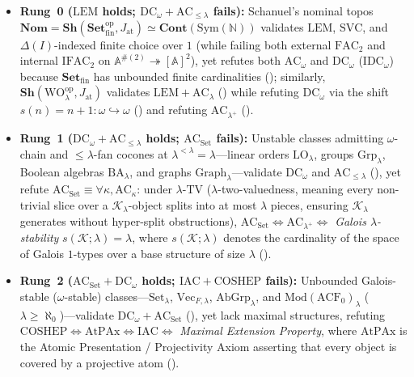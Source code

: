 \documentclass[10pt,twoside,openright]{book}
\theoremstyle{crmplain}
\theoremstyle{crmdef}
\theoremstyle{crmremark}
\begin{document}
\begin{itemize}[leftmargin=1.5em]
  \item \textbf{Rung~0 ($\mathrm{LEM}$ holds; $\mathrm{DC}_\omega + \mathrm{AC}_{\le \lambda}$ fails):} Schanuel's nominal topos $\mathbf{Nom} = \mathbf{Sh}(\mathbf{Set}_{\mathrm{fin}}^{\mathrm{op}}, J_{\mathrm{at}}) \simeq \mathbf{Cont}(\mathrm{Sym}(\mathbb{N}))$ validates $\mathrm{LEM}$, $\mathrm{SVC}$, and $\Delta(I)$-indexed finite choice over $1$ (while failing both external $\mathrm{FAC}_2$ and internal $\mathrm{IFAC}_2$ on $\mathbb{A}^{\#(2)} \twoheadrightarrow [\mathbb{A}]^2$), yet refutes both $\mathrm{AC}_\omega$ and $\mathrm{DC}_\omega$ ($\mathrm{IDC}_\omega$) because $\mathbf{Set}_{\mathrm{fin}}$ has unbounded finite cardinalities (\cite[Theorem~7.9]{Kihara26}); similarly, $\mathbf{Sh}(\mathrm{WO}_\lambda^{\mathrm{op}}, J_{\mathrm{at}})$ validates $\mathrm{LEM} + \mathrm{AC}_\lambda$ (\cite[Proposition~7.8]{Kihara26}) while refuting $\mathrm{DC}_\omega$ via the shift $s(n) = n + 1 : \omega \hookrightarrow \omega$ (\cite[Proposition~7.5]{Kihara26}) and refuting $\mathrm{AC}_{\lambda^+}$ (\cite[Proposition~7.7]{Kihara26}).
  \item \textbf{Rung~1 ($\mathrm{DC}_\omega + \mathrm{AC}_{\le \lambda}$ holds; $\mathrm{AC}_{\mathrm{Set}}$ fails):} Unstable classes admitting $\omega$-chain and $\le \lambda$-fan cocones at $\lambda^{<\lambda} = \lambda$---linear orders $\mathrm{LO}_\lambda$, groups $\mathrm{Grp}_\lambda$, Boolean algebras $\mathrm{BA}_\lambda$, and graphs $\mathrm{Graph}_\lambda$---validate $\mathrm{DC}_\omega$ and $\mathrm{AC}_{\le \lambda}$ (\cite[Theorems~3.3--3.4 and Table~1]{Kihara26}), yet refute $\mathrm{AC}_{\mathrm{Set}} \equiv \forall \kappa, \mathrm{AC}_\kappa$: under $\lambda$-$\mathrm{TV}$ ($\lambda$-two-valuedness, meaning every non-trivial slice over a $\mathcal{K}_\lambda$-object splits into at most $\lambda$ pieces, ensuring $\mathcal{K}_\lambda$ generates without hyper-split obstructions), $\mathrm{AC}_{\mathrm{Set}} \iff \mathrm{AC}_{\lambda^+} \iff$ \emph{Galois $\lambda$-stability} $s(\mathcal{K}; \lambda) = \lambda$, where $s(\mathcal{K}; \lambda)$ denotes the cardinality of the space of Galois $1$-types over a base structure of size $\lambda$ (\cite[Theorems~5.6 and~5.10; see also Theorem~6.34 for Polish groups]{Kihara26}).
  \item \textbf{Rung~2 ($\mathrm{AC}_{\mathrm{Set}} + \mathrm{DC}_\omega$ holds; $\mathrm{IAC} + \mathrm{COSHEP}$ fails):} Unbounded Galois-stable ($\omega$-stable) classes---$\mathrm{Set}_\lambda$, $\mathrm{Vec}_{F, \lambda}$, $\mathrm{AbGrp}_\lambda$, and $\mathrm{Mod}(\mathrm{ACF}_0)_\lambda$ ($\lambda \ge \aleph_0$)---validate $\mathrm{DC}_\omega + \mathrm{AC}_{\mathrm{Set}}$ (\cite[Theorem~5.6, Corollary~7.1]{Kihara26}), yet lack maximal structures, refuting $\mathrm{COSHEP} \iff \mathrm{AtPAx} \iff \mathrm{IAC} \iff$ \emph{Maximal Extension Property}, where $\mathrm{AtPAx}$ is the Atomic Presentation / Projectivity Axiom asserting that every object is covered by a projective atom (\cite[Proposition~6.6 and Theorems~6.2, 6.7, and~6.8]{Kihara26}).

\end{itemize}
\end{document}

